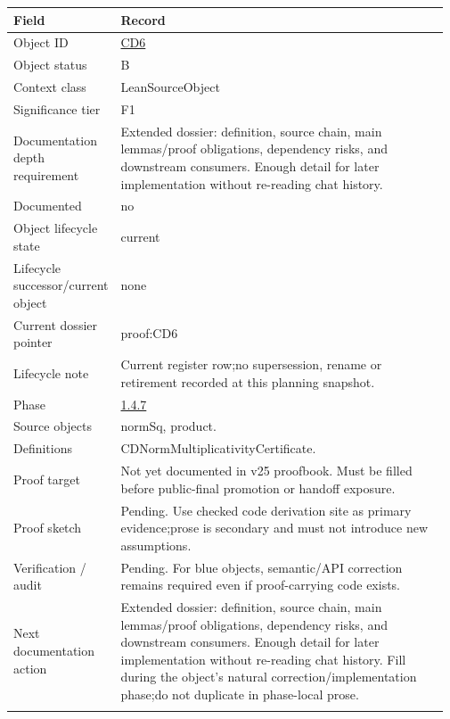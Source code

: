 \begin{longtable}{L{0.16\linewidth} L{0.81\linewidth}}
\hline
\textbf{Field} & \textbf{Record}\\
\hline
Object ID & \hyperlink{object-row-CD6}{CD6}\\
\hline\addlinespace[0.20em]
Object status & B\\
\hline\addlinespace[0.20em]
Context class & LeanSourceObject\\
\hline\addlinespace[0.20em]
Significance tier & F1\\
\hline\addlinespace[0.20em]
Documentation depth requirement & Extended dossier: definition, source chain, main lemmas/\allowbreak{}proof obligations, dependency risks, and downstream consumers. Enough detail for later implementation without re-reading chat history.\\
\hline\addlinespace[0.20em]
Documented & no\\
\hline\addlinespace[0.20em]
Object lifecycle state & current\\
\hline\addlinespace[0.20em]
Lifecycle successor/\allowbreak{}current object & none\\
\hline\addlinespace[0.20em]
Current dossier pointer & proof:CD6\\
\hline\addlinespace[0.20em]
Lifecycle note & Current register row;\newline no supersession, rename or retirement recorded at this planning snapshot.\\
\hline\addlinespace[0.20em]
Phase & \hyperlink{phase-row-1-4-7}{1.4.7}\\
\hline\addlinespace[0.20em]
Source objects & normSq, product.\\
\hline\addlinespace[0.20em]
Definitions & CDNormMultiplicativityCertificate.\\
\hline\addlinespace[0.20em]
Proof target & Not yet documented in v25 proofbook. Must be filled before public-final promotion or handoff exposure.\\
\hline\addlinespace[0.20em]
Proof sketch & Pending. Use checked code derivation site as primary evidence;\newline prose is secondary and must not introduce new assumptions.\\
\hline\addlinespace[0.20em]
Verification /\allowbreak{} audit & Pending. For blue objects, semantic/\allowbreak{}API correction remains required even if proof-carrying code exists.\\
\hline\addlinespace[0.20em]
Next documentation action & Extended dossier: definition, source chain, main lemmas/\allowbreak{}proof obligations, dependency risks, and downstream consumers. Enough detail for later implementation without re-reading chat history. Fill during the object's natural correction/\allowbreak{}implementation phase;\newline do not duplicate in phase-local prose.\\
\hline\addlinespace[0.20em]
\end{longtable}
